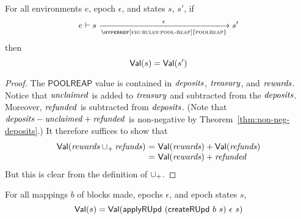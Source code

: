 \begin{lemma}
  \label{lemma:poolreap-pres-of-value}
  For all environments $e$, epoch $\epsilon$, and states $s$, $s'$, if
  \begin{equation*}
    e\vdash s\trans{\hyperref[fig:rules:pool-reap]{poolreap}}{\epsilon}s'
  \end{equation*}
  then
  \begin{equation*}
    \mathsf{Val}(s) = \mathsf{Val}(s')
  \end{equation*}
\end{lemma}

\begin{proof}
  The $\mathsf{POOLREAP}$ value is contained in
  $\mathit{deposits}$, $\mathit{treasury}$, and $\mathit{rewards}$.
  Notice that $\mathit{unclaimed}$ is added to $\mathit{treasury}$
  and subtracted from the $\mathit{deposits}$.
  Moreover, $\mathit{refunded}$ is subtracted from $\mathit{deposits}$.
  (Note that $\mathit{deposits}-\mathit{unclaimed}+\mathit{refunded}$
  is non-negative by Theorem~\ref{thm:non-neg-deposits}.)
  It therefore suffices to show that
  \begin{equation*}
    \begin{array}{r@{~=~}l}
    \Val(\var{rewards}\unionoverridePlus\var{refunds})
    & \Val(\var{rewards}) + \Val(\var{refunds})
    \\
    & \Val(\var{rewards}) + \var{refunded}
    \end{array}
  \end{equation*}
  But this is clear from the definition of $\mathbin{\cup_{+}}$.
\end{proof}

\begin{lemma}
  \label{lemma:ru-pres-of-value}
  For all mappings $b$ of blocks made, epochs $\epsilon$, and epoch states $s$,
  \begin{equation*}
    \mathsf{Val}(s) = \mathsf{Val}(\mathsf{applyRUpd}~(\mathsf{createRUpd}~b~s)~\epsilon~s)
  \end{equation*}
\end{lemma}

